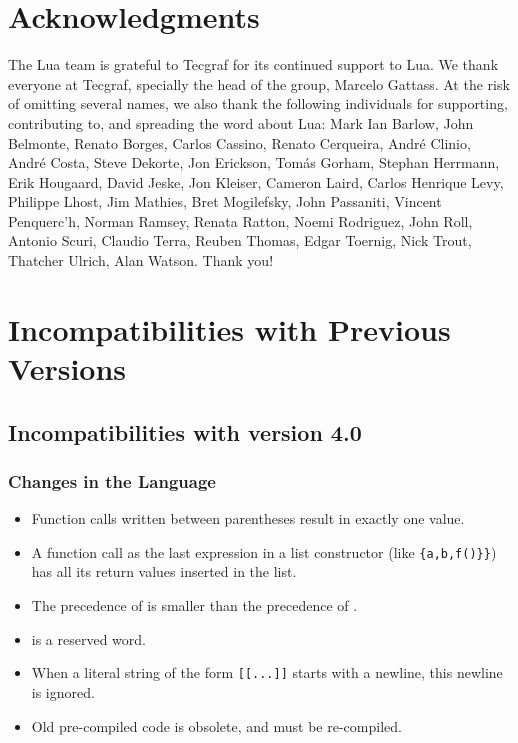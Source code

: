 \documentclass[11pt,twoside,draft]{article}
\makeatletter
\def\tecgraf{{\sf Tecgraf}}
\newcommand{\Index}[1]{#1\index{#1@{\lowercase{#1}}}}
\makeatother
\begin{document}
\section*{Acknowledgments}

The Lua team is grateful to \tecgraf{} for its continued support to Lua.
We thank everyone at \tecgraf{},
specially the head of the group, Marcelo Gattass.
At the risk of omitting several names,
we also thank the following individuals for supporting,
contributing to, and spreading the word about Lua:
Mark Ian Barlow,
John Belmonte,
Renato Borges,
Carlos Cassino,
Renato Cerqueira,
Andr\'e Clinio,
Andr\'e Costa,
Steve Dekorte,
Jon Erickson,
Tom\'as Gorham,
Stephan Herrmann,
Erik Hougaard,
David Jeske,
Jon Kleiser,
Cameron Laird,
Carlos Henrique Levy,
Philippe Lhost,
Jim Mathies,
Bret Mogilefsky,
John Passaniti,
Vincent Penquerc'h,
Norman Ramsey,
Renata Ratton,
Noemi Rodriguez,
John Roll,
Antonio Scuri,
Claudio Terra,
Reuben Thomas,
Edgar Toernig,
Nick Trout,
Thatcher Ulrich,
Alan Watson.
Thank you!


\appendix

\section*{Incompatibilities with Previous Versions}

\subsection*{Incompatibilities with \Index{version 4.0}}

\subsubsection*{Changes in the Language}
\begin{itemize}

\item
Function calls written between parentheses result in exactly one value.

\item
A function call as the last expression in a list constructor
(like \verb|{a,b,f()}}|) has all its return values inserted in the list.

\item
The precedence of  is smaller than the precedence of .

\item
{} is a reserved word.

\item
When a literal string of the form \verb|[[...]]| starts with a newline,
this newline is ignored.

\item Old pre-compiled code is obsolete, and must be re-compiled.

\end{itemize}
\end{document}
